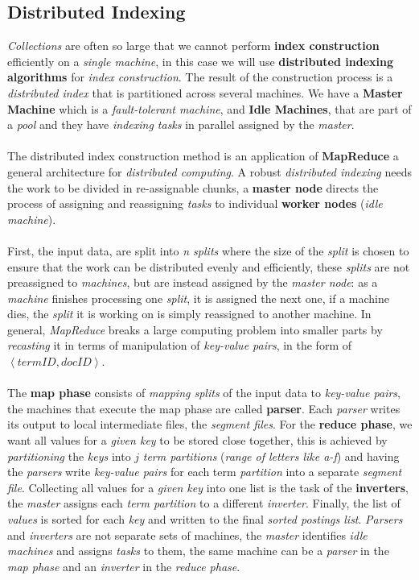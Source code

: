 \documentclass{article}
\begin{document}
\subsection{Distributed Indexing}
\emph{Collections} are often so large that we cannot perform \textbf{index construction} efficiently on a \emph{single machine}, in this case we will use \textbf{distributed indexing algorithms} for \emph{index construction}. The result of the construction process is a \emph{distributed index} that is partitioned across several machines. We have a \textbf{Master Machine} which is a \emph{fault-tolerant machine}, and \textbf{Idle Machines}, that are part of a \emph{pool} and they have \emph{indexing tasks} in parallel assigned by the \emph{master}. \\\\ The distributed index construction method is an application of \textbf{MapReduce} a general architecture for \emph{distributed computing}.  A robust \emph{distributed indexing} needs the work to be divided in re-assignable chunks, a \textbf{master node} directs the process of assigning and reassigning \emph{tasks} to individual \textbf{worker nodes} (\emph{idle machine}). \\\\First, the input data, are split into \emph{n splits} where the size of the \emph{split} is chosen to ensure that the work can be distributed evenly and efficiently, these \emph{splits} are not preassigned to \emph{machines}, but are instead assigned by the \emph{master node}: as a \emph{machine} finishes processing one \emph{split}, it is assigned the next one, if a machine dies, the \emph{split} it is working on is simply reassigned to another machine. In general, \emph{MapReduce} breaks a large computing problem into smaller parts by \emph{recasting} it in terms of manipulation of\emph{ key-value pairs}, in the form of $\left \langle termID, docID \right \rangle$. \\\\The \textbf{map phase} consists of \emph{mapping splits} of the input data to \emph{key-value pairs}, the machines that execute the map phase are called \textbf{parser}. Each \emph{parser} writes its output to local intermediate files, the \emph{segment files}. For the \textbf{reduce phase}, we want all values for a \emph{given key} to be stored close together, this is achieved by \emph{partitioning} the \emph{keys} into $j$ \emph{term partitions} (\emph{range of letters like a-f}) and having the \emph{parsers} write \emph{key-value pairs} for each term \emph{partition} into a separate \emph{segment file}. Collecting all values for a \emph{given key} into one list is the task of the \textbf{inverters}, the \emph{master} assigns each \emph{term partition} to a different \emph{inverter}. Finally, the list of \emph{values} is sorted for each \emph{key} and written to the final \emph{sorted postings list}. \emph{Parsers} and \emph{inverters} are not separate sets of machines, the \emph{master} identifies \emph{idle machines} and assigns \emph{tasks} to them, the same machine can be a \emph{parser} in the \emph{map phase} and an \emph{inverter} in the \emph{reduce phase}.
\end{document}
